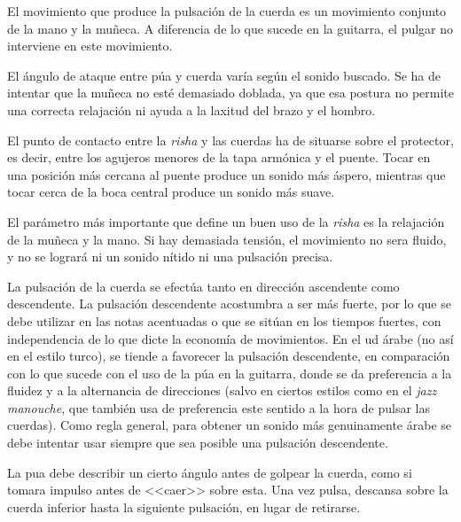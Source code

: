 El movimiento que produce la pulsación de la cuerda es un movimiento conjunto de la mano y la muñeca. A diferencia de lo que sucede en la guitarra, el pulgar no interviene en este movimiento.

El ángulo de ataque entre púa y cuerda varía según el sonido buscado. Se ha de intentar que la muñeca no esté demasiado doblada, ya que esa postura no permite una correcta relajación ni ayuda a la laxitud del brazo y el hombro.

El punto de contacto entre la \emph{risha} y las cuerdas ha de situarse sobre el protector, es decir, entre los agujeros menores de la tapa armónica y el puente. Tocar en una posición más cercana al puente produce un sonido más áspero, mientras que tocar cerca de la boca central produce un sonido más suave.

El parámetro más importante que define un buen uso de la \emph{risha} es la relajación de la muñeca y la mano. Si hay demasiada tensión, el movimiento no sera fluido, y no se logrará ni un sonido nítido ni una pulsación precisa.

La pulsación de la cuerda se efectúa tanto en dirección ascendente como descendente. La pulsación descendente acostumbra a ser más fuerte, por lo que se debe utilizar en las notas acentuadas o que se sitúan en los tiempos fuertes, con independencia de lo que dicte la economía de movimientos. En el ud árabe (no así en el estilo turco), se tiende a favorecer la pulsación descendente, en comparación con lo que sucede con el uso de la púa en la guitarra, donde se da preferencia a la fluidez y a la alternancia de direcciones (salvo en ciertos estilos como en el \emph{jazz manouche}, que también usa de preferencia este sentido a la hora de pulsar las cuerdas). Como regla general, para obtener un sonido más genuinamente árabe se debe intentar usar siempre que sea posible una pulsación descendente.

La pua debe describir un cierto ángulo antes de golpear la cuerda, como si tomara impulso antes de <<caer>> sobre esta. Una vez pulsa, descansa sobre la cuerda inferior hasta la siguiente pulsación, en lugar de retirarse.

